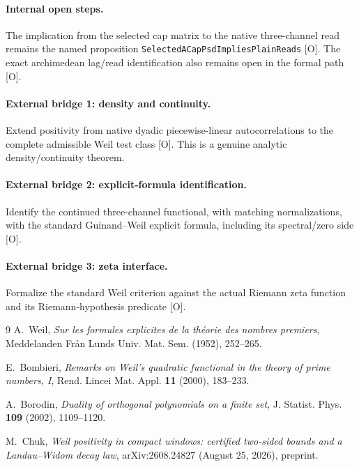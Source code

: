 \documentclass[11pt]{article}
\newcommand{\Ograde}{\textnormal{\small[O]}}
\newcommand{\code}[1]{\nolinkurl{#1}}
\begin{document}
\paragraph{Internal open steps.}
The implication from the selected cap matrix to the native
three-channel read remains the named proposition
\code{SelectedACapPsdImpliesPlainReads} \Ograde.  The exact
archimedean lag/read identification also remains open in the formal
path \Ograde.

\paragraph{External bridge 1: density and continuity.}
Extend positivity from native dyadic piecewise-linear
autocorrelations to the complete admissible Weil test class
\Ograde.  This is a genuine analytic density/continuity theorem.

\paragraph{External bridge 2: explicit-formula identification.}
Identify the continued three-channel functional, with matching
normalizations, with the standard Guinand--Weil explicit formula,
including its spectral/zero side \Ograde.

\paragraph{External bridge 3: zeta interface.}
Formalize the standard Weil criterion against the actual Riemann
zeta function and its Riemann-hypothesis predicate \Ograde.

\medskip\noindent
{}

\begin{thebibliography}{9}
A.~Weil, \emph{Sur les formules explicites de la th\'eorie des
nombres premiers}, Meddelanden Fr\r an Lunds Univ. Mat. Sem. (1952),
252--265.

E.~Bombieri, \emph{Remarks on Weil's quadratic functional in the
theory of prime numbers, I}, Rend. Lincei Mat. Appl. \textbf{11}
(2000), 183--233.

A.~Borodin, \emph{Duality of orthogonal polynomials on a finite set},
J. Statist. Phys. \textbf{109} (2002), 1109--1120.

M.~Chuk, \emph{Weil positivity in compact windows: certified
two-sided bounds and a Landau--Widom decay law},
arXiv:2608.24827 (August 25, 2026), preprint.
\end{thebibliography}
\end{document}
